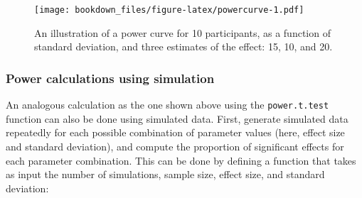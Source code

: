 \documentclass[12pt,]{krantz}
\newenvironment{Shaded}{\begin{snugshade}}{\end{snugshade}}
\newcommand{\CommentTok}[1]{\textcolor[rgb]{0.56,0.35,0.01}{\textit{#1}}}
\newcommand{\ControlFlowTok}[1]{\textcolor[rgb]{0.13,0.29,0.53}{\textbf{#1}}}
\newcommand{\DataTypeTok}[1]{\textcolor[rgb]{0.13,0.29,0.53}{#1}}
\newcommand{\DecValTok}[1]{\textcolor[rgb]{0.00,0.00,0.81}{#1}}
\newcommand{\KeywordTok}[1]{\textcolor[rgb]{0.13,0.29,0.53}{\textbf{#1}}}
\newcommand{\NormalTok}[1]{#1}
\newcommand{\OperatorTok}[1]{\textcolor[rgb]{0.81,0.36,0.00}{\textbf{#1}}}
\newcommand{\OtherTok}[1]{\textcolor[rgb]{0.56,0.35,0.01}{#1}}
\newcommand{\StringTok}[1]{\textcolor[rgb]{0.31,0.60,0.02}{#1}}
\begin{document}
\begin{figure}
\centering
\texttt{[image: bookdown\_files/figure-latex/powercurve-1.pdf]}
\caption{\label{fig:powercurve}An illustration of a power curve for 10 participants, as a function of standard deviation, and three estimates of the effect: 15, 10, and 20.}
\end{figure}

\hypertarget{power-calculations-using-simulation}{%
\subsubsection{Power calculations using simulation}\label{power-calculations-using-simulation}}

An analogous calculation as the one shown above using the \texttt{power.t.test} function can also be done using simulated data.
First, generate simulated data repeatedly for each possible combination of parameter values (here, effect size and standard deviation), and compute the proportion of significant effects for each parameter combination. This can be done by defining a function that takes as input the number of simulations, sample size, effect size, and standard deviation:

\begin{Shaded}
\end{Shaded}
\end{document}
